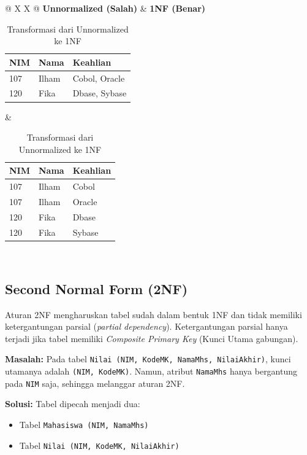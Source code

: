 \documentclass[11pt,a4paper]{article}
\begin{document}
\begin{table}[H]
	\centering
	\small
	\caption{Transformasi dari Unnormalized ke 1NF}
	\begin{tabularx}{\textwidth}{@{} X X @{}}
		\toprule
		\textbf{Unnormalized (Salah)} & \textbf{1NF (Benar)} \\
		\midrule
		\begin{tabular}[t]{@{}lll@{}}
			\toprule
			NIM & Nama  & Keahlian      \\
			\midrule
			107 & Ilham & Cobol, Oracle \\
			120 & Fika  & Dbase, Sybase \\
			\bottomrule
		\end{tabular}
		                              &
		\begin{tabular}[t]{@{}lll@{}}
			\toprule
			NIM & Nama  & Keahlian \\
			\midrule
			107 & Ilham & Cobol    \\
			107 & Ilham & Oracle   \\
			120 & Fika  & Dbase    \\
			120 & Fika  & Sybase   \\
			\bottomrule
		\end{tabular}                         \\
		\bottomrule
	\end{tabularx}
\end{table}

\subsection{Second Normal Form (2NF)}
Aturan 2NF mengharuskan tabel sudah dalam bentuk 1NF dan tidak memiliki ketergantungan parsial (\textit{partial dependency}). Ketergantungan parsial hanya terjadi jika tabel memiliki \textit{Composite Primary Key} (Kunci Utama gabungan).

\textbf{Masalah:} Pada tabel \texttt{Nilai (NIM, KodeMK, NamaMhs, NilaiAkhir)}, kunci utamanya adalah \texttt{(NIM, KodeMK)}. Namun, atribut \texttt{NamaMhs} hanya bergantung pada \texttt{NIM} saja, sehingga melanggar aturan 2NF.

\textbf{Solusi:} Tabel dipecah menjadi dua:
\begin{itemize}
	\item Tabel \texttt{Mahasiswa (NIM, NamaMhs)}
	\item Tabel \texttt{Nilai (NIM, KodeMK, NilaiAkhir)}
\end{itemize}
\end{document}
